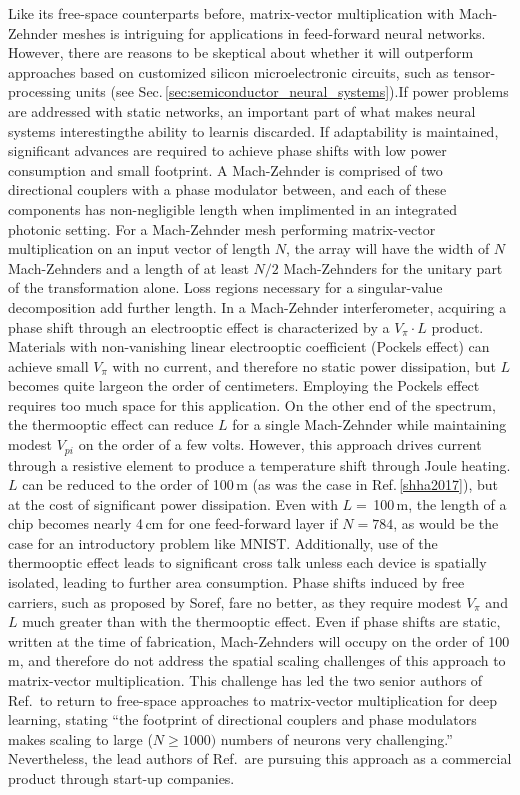 Like its free-space counterparts before, matrix-vector multiplication with Mach-Zehnder meshes is intriguing for applications in feed-forward neural networks. However, there are reasons to be skeptical about whether it will outperform approaches based on customized silicon microelectronic circuits, such as tensor-processing units (see Sec.\,\ref{sec:semiconductor_neural_systems}).If power problems are addressed with static networks, an important part of what makes neural systems interesting\textemdash the ability to learn\textemdash is discarded. If adaptability is maintained, significant advances are required to achieve phase shifts with low power consumption and small footprint. A Mach-Zehnder is comprised of two directional couplers with a phase modulator between, and each of these components has non-negligible length when implimented in an integrated photonic setting. For a Mach-Zehnder mesh performing matrix-vector multiplication on an input vector of length $N$, the array will have the width of $N$ Mach-Zehnders and a length of at least $N/2$ Mach-Zehnders for the unitary part of the transformation alone. Loss regions necessary for a singular-value decomposition add further length. In a Mach-Zehnder interferometer, acquiring a phase shift through an electrooptic effect is characterized by a $V_{\pi}\cdot L$ product. Materials with non-vanishing linear electrooptic coefficient (Pockels effect) can achieve small $V_{\pi}$ with no current, and therefore no static power dissipation, but $L$ becomes quite large\textemdash on the order of centimeters. Employing the Pockels effect requires too much space for this application. On the other end of the spectrum, the thermooptic effect can reduce $L$ for a single Mach-Zehnder while maintaining modest $V_{pi}$ on the order of a few volts. However, this approach drives current through a resistive element to produce a temperature shift through Joule heating. $L$ can be reduced to the order of 100\,\textmu m (as was the case in Ref.\,\ref{shha2017}), but at the cost of significant power dissipation. Even with $L=$\,100\,\textmu m, the length of a chip becomes nearly 4\,cm for one feed-forward layer if $N = 784$, as would be the case for an introductory problem like MNIST. Additionally, use of the thermooptic effect leads to significant cross talk unless each device is spatially isolated, leading to further area consumption. Phase shifts induced by free carriers, such as proposed by Soref, fare no better, as they require modest $V_{\pi}$ and $L$ much greater than with the thermooptic effect. Even if phase shifts are static, written at the time of fabrication, Mach-Zehnders will occupy on the order of 100\,\textmu m, and therefore do not address the spatial scaling challenges of this approach to matrix-vector multiplication. This challenge has led the two senior authors of Ref.\,\cite{shha2017} to return to free-space approaches to matrix-vector multiplication for deep learning, stating ``the footprint of directional couplers and phase modulators makes scaling to large ($N\ge 1000)$ numbers of neurons very challenging.'' Nevertheless, the lead authors of Ref.\,\cite{shha2017} are pursuing this approach as a commercial product through start-up companies.

